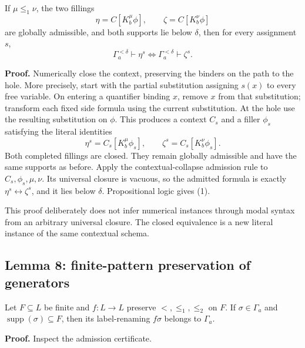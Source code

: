\documentclass[
  11pt,
  letterpaper,
]{article}
\begin{document}
If \(\mu\leq_1\nu\), the two fillings \[
\eta=C[K_b^\mu\phi],\qquad
\zeta=C[K_b^\nu\phi]
\] are globally admissible, and both supports lie below \(\delta\), then
for every assignment \(s\), \[
\Gamma_a^{<\delta}\vdash\eta^s
\iff
\Gamma_a^{<\delta}\vdash\zeta^s.
\tag{1}
\]

\textbf{Proof.} Numerically close the context, preserving the binders on
the path to the hole. More precisely, start with the partial
substitution assigning \(s(x)\) to every free variable. On entering a
quantifier binding \(x\), remove \(x\) from that substitution; transform
each fixed side formula using the current substitution. At the hole use
the resulting substitution on \(\phi\). This produces a context \(C_s\)
and a filler \(\phi_s\) satisfying the literal identities \[
\eta^s=C_s[K_b^\mu\phi_s],\qquad
\zeta^s=C_s[K_b^\nu\phi_s].
\] Both completed fillings are closed. They remain globally admissible
and have the same supports as before. Apply the contextual-collapse
admission rule to \(C_s,\phi_s,\mu,\nu\). Its universal closure is
vacuous, so the admitted formula is exactly
\(\eta^s\leftrightarrow\zeta^s\), and it lies below \(\delta\).
Propositional logic gives (1).

This proof deliberately does not infer numerical instances through modal
syntax from an arbitrary universal closure. The closed equivalence is a
new literal instance of the same contextual schema.

\subsection{Lemma 8: finite-pattern preservation of
generators}\label{lemma-8-finite-pattern-preservation-of-generators}

Let \(F\subseteq L\) be finite and \(f:L\to L\) preserve
\(<,\leq_1,\leq_2\) on \(F\). If \(\sigma\in\Gamma_a\) and
\(\operatorname{supp}(\sigma)\subseteq F\), then its label-renaming
\(f\sigma\) belongs to \(\Gamma_a\).

\textbf{Proof.} Inspect the admission certificate.
\end{document}
